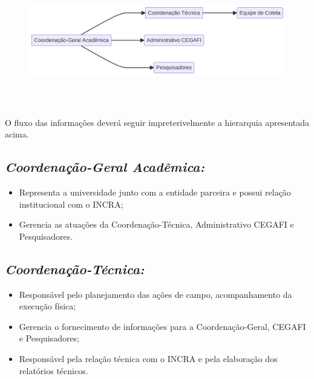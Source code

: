 \documentclass[
  letterpaper,
]{report}
\providecommand{\tightlist}{%
  \setlength{\itemsep}{0pt}\setlength{\parskip}{0pt}}\usepackage{longtable,booktabs,array}
\begin{document}
\begin{figure}[H]

{\centering \includegraphics[width=8.07in,height=2.24in]{./3-metodologia_files/figure-latex/mermaid-figure-1.png}

}

\end{figure}

O fluxo das informações deverá seguir impreterivelmente a hierarquia
apresentada acima.

\hypertarget{coordenauxe7uxe3o-geral-acaduxeamica}{%
\subsection{\texorpdfstring{\emph{Coordenação-Geral
Acadêmica:}}{Coordenação-Geral Acadêmica:}}\label{coordenauxe7uxe3o-geral-acaduxeamica}}

\begin{itemize}
\tightlist
\item
  Representa a universidade junto com a entidade parceira e possui
  relação institucional com o INCRA;
\item
  Gerencia as atuações da Coordenação-Técnica, Administrativo CEGAFI e
  Pesquisadores.
\end{itemize}

\hypertarget{coordenauxe7uxe3o-tuxe9cnica}{%
\subsection{\texorpdfstring{\emph{Coordenação-Técnica:}}{Coordenação-Técnica:}}\label{coordenauxe7uxe3o-tuxe9cnica}}

\begin{itemize}
\item
  Responsável pelo planejamento das ações de campo, acompanhamento da
  execução física;
\item
  Gerencia o fornecimento de informações para a Coordenação-Geral,
  CEGAFI e Pesquisadores;
\item
  Responsável pela relação técnica com o INCRA e pela elaboração dos
  relatórios técnicos.
\end{itemize}
\end{document}
